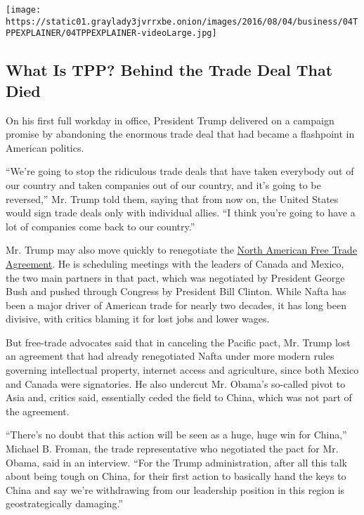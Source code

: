 \href{https://www.nytimes3xbfgragh.onion/interactive/2016/business/tpp-explained-what-is-trans-pacific-partnership.html}{}

\texttt{[image: https://static01.graylady3jvrrxbe.onion/images/2016/08/04/business/04TPPEXPLAINER/04TPPEXPLAINER-videoLarge.jpg]}

\hypertarget{what-is-tpp-behind-the-trade-deal-that-died}{%
\subsection{What Is TPP? Behind the Trade Deal That
Died}\label{what-is-tpp-behind-the-trade-deal-that-died}}

On his first full workday in office, President Trump delivered on a
campaign promise by abandoning the enormous trade deal that had became a
flashpoint in American politics.

``We're going to stop the ridiculous trade deals that have taken
everybody out of our country and taken companies out of our country, and
it's going to be reversed,'' Mr. Trump told them, saying that from now
on, the United States would sign trade deals only with individual
allies. ``I think you're going to have a lot of companies come back to
our country.''

Mr. Trump may also move quickly to renegotiate the
\href{https://www.nytimes3xbfgragh.onion/2016/10/04/upshot/donald-trump-trashes-nafta-but-unwinding-it-would-come-at-a-huge-cost.html}{North
American Free Trade Agreement}. He is scheduling meetings with the
leaders of Canada and Mexico, the two main partners in that pact, which
was negotiated by President George Bush and pushed through Congress by
President Bill Clinton. While Nafta has been a major driver of American
trade for nearly two decades, it has long been divisive, with critics
blaming it for lost jobs and lower wages.

But free-trade advocates said that in canceling the Pacific pact, Mr.
Trump lost an agreement that had already renegotiated Nafta under more
modern rules governing intellectual property, internet access and
agriculture, since both Mexico and Canada were signatories. He also
undercut Mr. Obama's so-called pivot to Asia and, critics said,
essentially ceded the field to China, which was not part of the
agreement.

``There's no doubt that this action will be seen as a huge, huge win for
China,'' Michael B. Froman, the trade representative who negotiated the
pact for Mr. Obama, said in an interview. ``For the Trump
administration, after all this talk about being tough on China, for
their first action to basically hand the keys to China and say we're
withdrawing from our leadership position in this region is
geostrategically damaging.''


